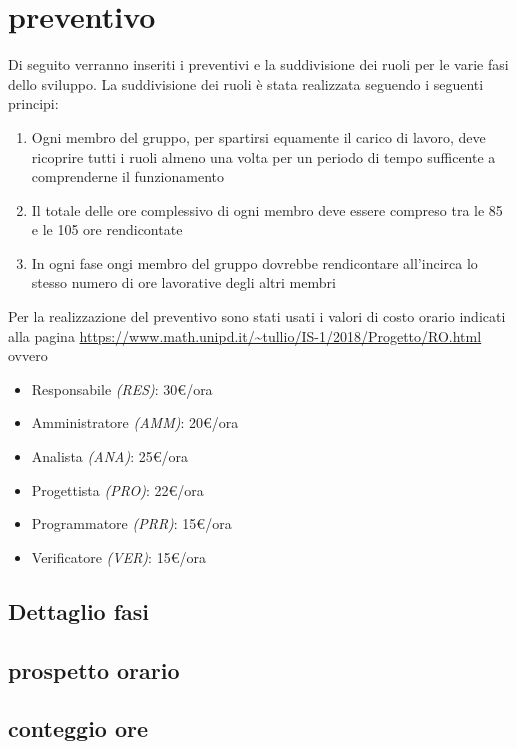 	\section{preventivo}
	Di seguito verranno inseriti i preventivi e la suddivisione dei ruoli per le varie fasi dello sviluppo. La suddivisione dei ruoli è stata realizzata seguendo i seguenti principi:
	\begin{enumerate}
		\item Ogni membro del gruppo, per spartirsi equamente il carico di lavoro, deve ricoprire tutti i ruoli almeno una volta per un periodo di tempo sufficente a comprenderne il funzionamento
		\item Il totale delle ore complessivo di ogni membro deve essere compreso tra le 85 e le 105 ore rendicontate
		\item In ogni fase ongi membro del gruppo dovrebbe rendicontare all'incirca lo stesso numero di ore lavorative degli altri membri
	\end{enumerate} 

	Per la realizzazione del preventivo sono stati usati i valori di costo orario indicati alla pagina \url{https://www.math.unipd.it/~tullio/IS-1/2018/Progetto/RO.html} ovvero
	\begin{itemize}
		\item Responsabile \textit{(RES)}: 30\euro/ora
		\item Amministratore \textit{(AMM)}: 20\euro/ora
		\item Analista \textit{(ANA)}: 25\euro/ora
		\item Progettista \textit{(PRO)}: 22\euro/ora
		\item Programmatore \textit{(PRR)}: 15\euro/ora
		\item Verificatore \textit{(VER)}: 15\euro/ora
	\end{itemize}	
	    \subsection{Dettaglio fasi}
		\subsection{prospetto orario}
		\subsection{conteggio ore}